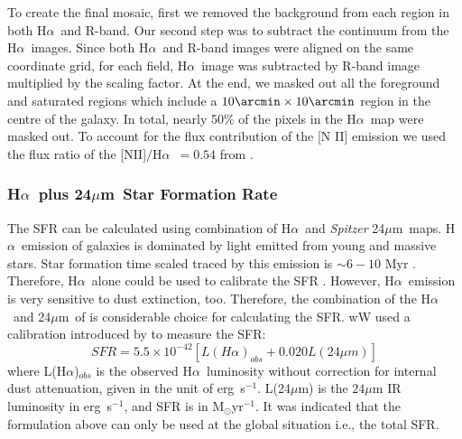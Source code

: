 \documentclass[useAMS,usenatbib]{mn2e}
\newcommand \halpha    {H$\alpha $\ }
\newcommand \um    {$\mu$m\ }
\newcommand \Spitzer {{\it Spitzer }}
\begin{document}
To create the final mosaic, first we removed the background from each region in both \halpha and R-band. Our second step was to subtract the continuum from the \halpha images. Since both \halpha and R-band images were aligned on the same coordinate grid, for each field, \halpha image was subtracted by R-band image multiplied by the scaling factor. At the end, we masked out all the foreground and saturated regions which include a $10\arcmin \times 10\arcmin$ region in the centre of the galaxy. In total, nearly 50$\%$ of the pixels in the \halpha map were masked out. To account for the flux contribution of the [N II] emission we used the flux ratio of the [NII]$/$\halpha $= 0.54$ from \cite{Kennicutt08}.


\subsubsection{\halpha plus 24\um Star Formation Rate}
\label{sec:sfr_halpha}

The SFR can be calculated using combination of \halpha and \Spitzer  24\um maps. \halpha emission of galaxies is dominated by light emitted from young and massive stars. Star formation time scaled traced by this emission is $\sim 6-10$ Myr \citep[e.g.,][]{Kennicutt09, Calzetti13}. Therefore, \halpha alone could be used to calibrate the SFR \citep[e.g.,][]{Osterbrock06, Kennicutt09}. However, \halpha emission is very sensitive to dust extinction, too. Therefore, the combination of the \halpha and 24\um of is considerable choice for calculating the SFR. wW used a calibration introduced by \cite{Kennicutt09} to measure the SFR:
\begin{equation}
\label{equ: halphaplus24_g}
SFR = 5.5 \times 10^{-42}[L(H{\alpha})_{obs} + 0.020L(24\mu m)]
\end{equation}
where L(H${\alpha}$)$_{obs}$ is the observed \halpha luminosity without correction for internal dust attenuation, given in the unit of erg~s$^{-1}$. L(24$\mu$m) is the $24\mu$m IR luminosity in erg~s$^{-1}$, and SFR is in M$_{\odot}$yr$^{-1}$. It was indicated that the formulation above can only be used at the global situation i.e., the total SFR.
\end{document}
